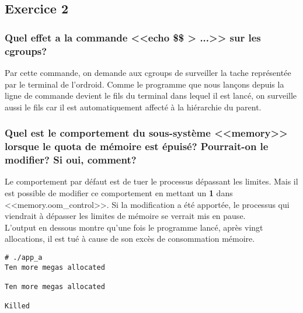 \subsection{Exercice 2}
\subsubsection{Quel effet a la commande <<echo \$\$ > ...>> sur les cgroups?}
Par cette commande, on demande aux cgroups de surveiller la tache représentée par le terminal de l'ordroid. Comme le programme que nous lançons depuis la ligne de commande devient le fils du terminal dans lequel il est lancé, on surveille aussi le fils car il est automatiquement affecté à la hiérarchie du parent. 

\subsubsection{Quel est le comportement du sous-système <<memory>> lorsque le quota de mémoire est épuisé? Pourrait-on le modifier? Si oui, comment?}
Le comportement par défaut est de tuer le processus dépassant les limites. Mais il est possible de modifier ce comportement en mettant un \textbf{1} dans <<memory.oom_control>>. Si la modification a été apportée, le processus qui viendrait à dépasser les limites de mémoire se verrait mis en pause.\\

L'output en dessous montre qu'une fois le programme  lancé, après vingt allocations, il est tué à cause de son excès de consommation mémoire. 
\begin{lstlisting}
# ./app_a 
Ten more megas allocated

Ten more megas allocated

Killed
\end{lstlisting}


